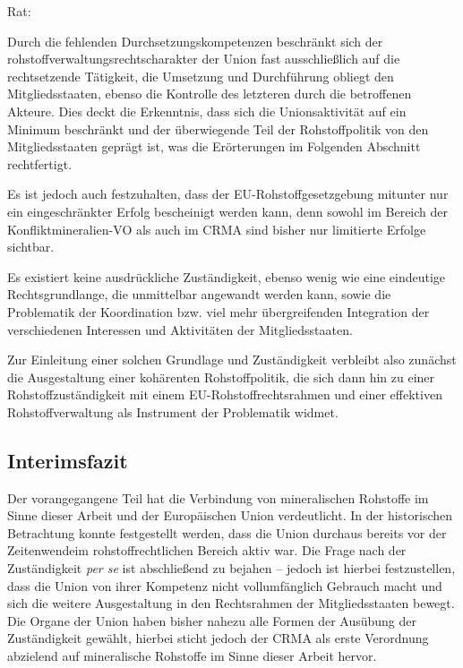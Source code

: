 \documentclass[12pt,a4paper,oneside]{book} %
\begin{document}
Rat:



Durch die fehlenden Durchsetzungskompetenzen beschränkt sich der rohstoffverwaltungsrechtscharakter der Union fast ausschließlich auf die rechtsetzende Tätigkeit, die Umsetzung und Durchführung obliegt den Mitgliedsstaaten, ebenso die Kontrolle des letzteren durch die betroffenen Akteure. Dies deckt die Erkenntnis, dass sich die Unionsaktivität auf ein Minimum beschränkt und der überwiegende Teil der Rohstoffpolitik von den Mitgliedsstaaten geprägt ist, was die Erörterungen im Folgenden Abschnitt rechtfertigt.

Es ist jedoch auch festzuhalten, dass der EU-Rohstoffgesetzgebung mitunter nur ein eingeschränkter Erfolg bescheinigt werden kann, denn sowohl im Bereich der Konfliktmineralien-VO als auch im CRMA sind bisher nur limitierte Erfolge sichtbar.

Es existiert keine ausdrückliche Zuständigkeit, ebenso wenig wie eine eindeutige Rechtsgrundlange, die unmittelbar angewandt werden kann, sowie die Problematik der Koordination bzw. viel mehr übergreifenden Integration der verschiedenen Interessen und Aktivitäten der Mitgliedsstaaten.

Zur Einleitung einer solchen Grundlage und Zuständigkeit verbleibt also zunächst die Ausgestaltung einer kohärenten Rohstoffpolitik, die sich dann hin zu einer Rohstoffzuständigkeit mit einem EU-Rohstoffrechtsrahmen und einer effektiven Rohstoffverwaltung als Instrument der Problematik widmet.


\subsection{Interimsfazit}
Der vorangegangene Teil hat die Verbindung von mineralischen Rohstoffe im Sinne dieser Arbeit und der Europäischen Union verdeutlicht. In der historischen Betrachtung konnte festgestellt werden, dass die Union durchaus bereits vor der \glqq Zeitenwende\grqq im rohstoffrechtlichen Bereich aktiv war.
Die Frage nach der Zuständigkeit \textit{per se} ist abschließend zu bejahen -- jedoch ist hierbei festzustellen, dass die Union von ihrer Kompetenz nicht vollumfänglich Gebrauch macht und sich die weitere Ausgestaltung in den Rechtsrahmen der Mitgliedsstaaten bewegt.
Die Organe der Union haben bisher nahezu alle Formen der Ausübung der Zuständigkeit gewählt, hierbei sticht jedoch der CRMA als erste Verordnung abzielend auf mineralische Rohstoffe im Sinne dieser Arbeit hervor.
\end{document}
